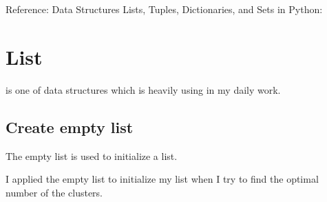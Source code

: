 \documentclass[letterpaper,12pt,english]{sphinxmanual}
\begin{document}
\sphinxAtStartPar
Reference:
Data Structures\sphinxhyphen{} Lists, Tuples, Dictionaries, and Sets in Python:


\section{List}
\label{\detokenize{struct:list}}
\sphinxAtStartPar
{} is one of data structures which is heavily using in my daily work.


\subsection{Create empty list}
\label{\detokenize{struct:create-empty-list}}
\sphinxAtStartPar
The empty list is used to initialize a list.

\sphinxAtStartPar
{}
\begin{quote}

\begin{sphinxVerbatim}[commandchars=\\\{\}]
  \PYG{p}{[}\PYG{p}{]}
  
\end{sphinxVerbatim}
\end{quote}

\sphinxAtStartPar
{}
\begin{quote}

\begin{sphinxVerbatim}[commandchars=\\\{\}]
\end{sphinxVerbatim}
\end{quote}

\sphinxAtStartPar
I applied the empty list to initialize my  list when I try to find the
optimal number of the clusters.
\end{document}
